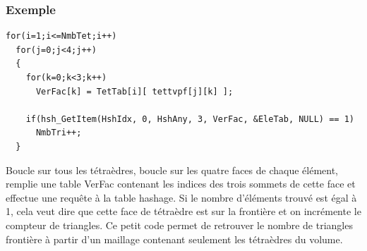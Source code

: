 \documentclass[a4paper,12pt]{article}
\begin{document}
\subsubsection*{Exemple}

\begin{tt}
\begin{verbatim}
for(i=1;i<=NmbTet;i++)
  for(j=0;j<4;j++)
  {
    for(k=0;k<3;k++)
      VerFac[k] = TetTab[i][ tettvpf[j][k] ];
    
    if(hsh_GetItem(HshIdx, 0, HshAny, 3, VerFac, &EleTab, NULL) == 1)
      NmbTri++;
  }
\end{verbatim}
\end{tt}
\normalfont

Boucle sur tous les tétraèdres, boucle sur les quatre faces de chaque élément, remplie une table VerFac contenant les indices des trois sommets de cette face et effectue une requête à la table hashage.
Si le nombre d'éléments trouvé est égal à 1, cela veut dire que cette face de tétraèdre est sur la frontière et on incrémente le compteur de triangles.
Ce petit code permet de retrouver le nombre de triangles frontière à partir d'un maillage contenant seulement les tétraèdres du volume.
\end{document}
